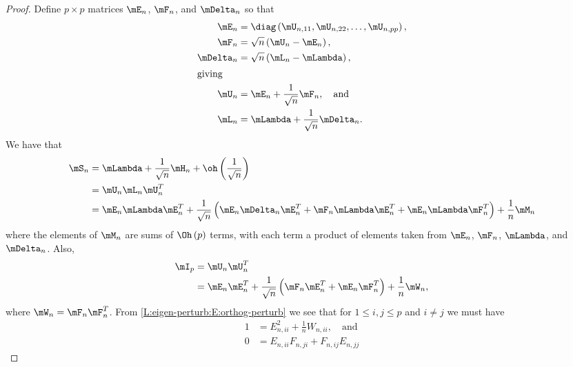 \begin{proof}
Define $p\times p$ matrices $\mE_n$, $\mF_n$, and $\mDelta_n$ so that
\begin{align}
    \mE_n
        &=
        \diag \left(
            \mU_{n,11},
            \mU_{n,22},
            \ldots,
            \mU_{n,pp}
        \right), \\
    \mF_n 
        &= 
        \sqrt{n} \left( \mU_n - \mE_n \right), \\
    \mDelta_{n}
        &=
        \sqrt{n} \left( \mL_n - \mLambda \right), \\
\intertext{giving}
    \mU_n
        &= \mE_n + \frac{1}{\sqrt{n}} \mF_n, \quad \text{and} \notag \\
    \mL_n
        &= \mLambda + \frac{1}{\sqrt{n}} \mDelta_{n}. \notag
\end{align}
We have that 
\begin{align}
    \mS_n 
    &= \mLambda 
       + \frac{1}{\sqrt{n}} \mH_n 
       + \oh \left( \frac{1}{\sqrt{n}}\right) \notag \\
    &= \mU_n \mL_n \mU_n^T \notag \\
    &= \mE_n \mLambda \mE_n^T
       + 
       \frac{1}{\sqrt{n}} \left(
           \mE_n \mDelta_n \mE_n^T
           +
           \mF_n \mLambda \mE_n^T
           +
           \mE_n \mLambda \mF_n^T
       \right)
       +
       \frac{1}{n}
       \mM_n \label{L:eigen-perturb:E:eigen-perturb}
\end{align}
where the elements of $\mM_n$ are sums of $\Oh\left( p \right)$ terms, with each term a product of elements taken from $\mE_n$, $\mF_n$, $\mLambda$, and $\mDelta_n$.  Also,
\begin{align}
    \mI_p
    &= \mU_n \mU_n^T \notag \\
    &= \mE_n \mE_n^T
       + 
       \frac{1}{\sqrt{n}} \left(
           \mF_n \mE_n^T
           +
           \mE_n \mF_n^T
       \right)
       + 
       \frac{1}{n}
       \mW_n, \label{L:eigen-perturb:E:orthog-perturb}
\end{align}
where $\mW_n = \mF_n \mF_n^T$.
From \eqref{L:eigen-perturb:E:orthog-perturb} we see that for $1 \leq i,j \leq p$ and $i \neq j$ we must have
\begin{subequations}
\begin{align}
    1 &= E_{n,ii}^2 
         + 
         \frac{1}{n} W_{n,ii}, 
         \quad \text{and}
         \label{L:eigen-perturb:E:orthog-perturb-1} \\
    0 &= E_{n,ii} F_{n,ji} 
         + 
         F_{n,ij} E_{n,jj} 

\end{align}
\end{subequations}
\end{proof}
